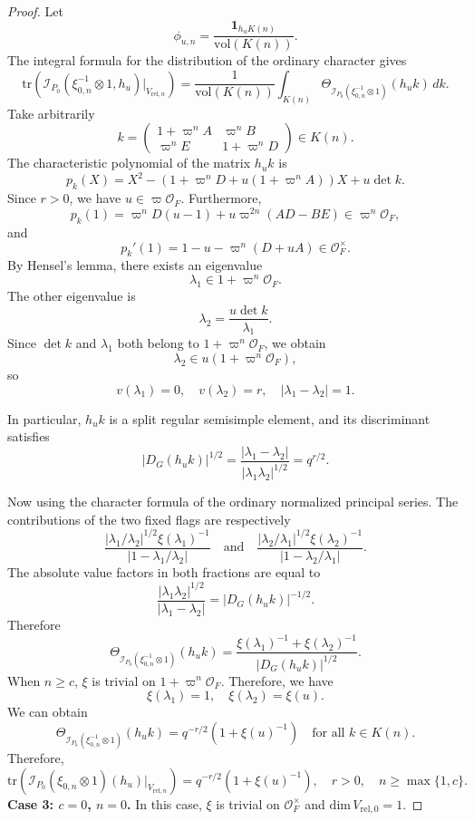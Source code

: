 \documentclass[11pt]{amsart}
\renewcommand{\rm}{\mathrm}
\theoremstyle{definition}
\numberwithin{equation}{section}
\begin{document}
\begin{proof}
		
		Let
		\[
		\phi_{u,n} = \frac{\mathbf{1}_{h_u K(n)}}{\rm{vol}(K(n))}.
		\]
		The integral formula for the distribution of the ordinary character gives
		\[
		\rm{tr}(\mathscr{I}_{P_0}(\xi^{-1}_{0,n}\otimes 1,h_u)|_{V_{\rm{rel},n}}) = \frac{1}{\rm{vol}(K(n))} \int_{K(n)} \Theta_{\mathscr{I}_{P_0}(\xi^{-1}_{0,n}\otimes 1)}(h_u k) \, dk.
		\]
		Take arbitrarily
		\[
		k = \begin{pmatrix} 1 + \varpi^n A & \varpi^n B \\ \varpi^n E & 1 + \varpi^n D \end{pmatrix} \in K(n).
		\]
		The characteristic polynomial of the matrix \(h_u k\) is
		\[
		p_k(X) = X^2 - (1 + \varpi^n D + u(1 + \varpi^n A))X + u \det k.
		\]
		Since \(r > 0\), we have \(u \in \varpi \mathcal{O}_F\). Furthermore,
		\[
		p_k(1) = \varpi^n D(u-1) + u \varpi^{2n} (AD - BE) \in \varpi^n \mathcal{O}_F,
		\]
		and
		\[
		p_k'(1) = 1 - u - \varpi^n (D + uA) \in \mathcal{O}_F^\times.
		\]
		By Hensel's lemma, there exists an eigenvalue
		\[
		\lambda_1 \in 1 + \varpi^n \mathcal{O}_F.
		\]
		The other eigenvalue is
		\[
		\lambda_2 = \frac{u \det k}{\lambda_1}.
		\]
		Since \(\det k\) and \(\lambda_1\) both belong to \(1 + \varpi^n \mathcal{O}_F\), we obtain
		\[
		\lambda_2 \in u(1 + \varpi^n \mathcal{O}_F),
		\]
		so
		\[
		v(\lambda_1) = 0, \quad v(\lambda_2) = r, \quad |\lambda_1 - \lambda_2| = 1.
		\]
		
		In particular, \(h_u k\) is a split regular semisimple element, and its discriminant satisfies
		\[
		|D_G(h_u k)|^{1/2} = \frac{|\lambda_1 - \lambda_2|}{|\lambda_1 \lambda_2|^{1/2}} = q^{r/2}.
		\]
		
		Now using the character formula of the ordinary normalized principal series. The contributions of the two fixed flags are respectively
		\[
		\frac{|\lambda_1 / \lambda_2|^{1/2} \xi(\lambda_1)^{-1}}{|1 - \lambda_1 / \lambda_2|}\quad \text{and}\quad \frac{|\lambda_2 / \lambda_1|^{1/2} \xi(\lambda_2)^{-1}}{|1 - \lambda_2 / \lambda_1|}.
		\]
		The absolute value factors in both fractions are equal to
		\[
		\frac{|\lambda_1 \lambda_2|^{1/2}}{|\lambda_1 - \lambda_2|} = |D_G(h_u k)|^{-1/2}.
		\]
		Therefore
		\[
		\Theta_{\mathscr{I}_{P_0}(\xi^{-1}_{0,n}\otimes 1)}(h_u k) = \frac{\xi(\lambda_1)^{-1} + \xi(\lambda_2)^{-1}}{|D_G(h_u k)|^{1/2}}.
		\]
		When \(n \ge c\), \(\xi\) is trivial on \(1 + \varpi^n \mathcal{O}_F\). Therefore, we have
		\[
		\xi(\lambda_1) = 1, \quad \xi(\lambda_2) = \xi(u).
		\]
		We can obtain
		\[
		\Theta_{\mathscr{I}_{P_0}(\xi^{-1}_{0,n}\otimes 1)}(h_u k) = q^{-r/2} (1 + \xi(u)^{-1}) \quad \text{for all } k \in K(n).
		\]
		Therefore,
		\[
		\rm{tr}(\mathscr{I}_{P_0}(\xi_{0,n}\otimes 1)(h_u)|_{V_{\rm{rel},n}}) = q^{-r/2} (1 + \xi(u)^{-1}), \quad r > 0, \quad n \ge \max\{1,c\}.
		\]
		\textbf{Case 3: $c=0$, \(n=0\).}
		In this case, \(\xi\) is trivial on \(\mathcal O_F^\times\) and \(\rm{dim}\,V_{\rm{rel},0}=1\).
		

\end{proof}
\end{document}
